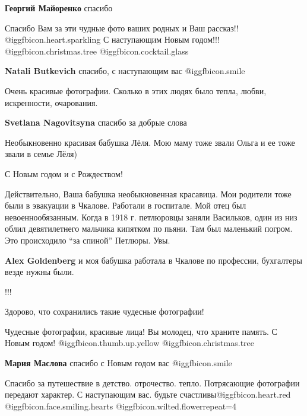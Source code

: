 \begin{itemize}
\textbf{Георгий Майоренко} спасибо

Спасибо Вам за эти чудные фото ваших родных и Ваш рассказ!! @igg{fbicon.heart.sparkling} 
С наступающим Новым годом!!! @igg{fbicon.christmas.tree}  @igg{fbicon.cocktail.glass} 

\textbf{Natali Butkevich} спасибо, с наступающим вас  @igg{fbicon.smile} 

Очень красивые фотографии. Сколько в этих людях было тепла, любви, искренности,
очарования.

\textbf{Svetlana Nagovitsyna} спасибо за добрые слова


Необыкновенно красивая бабушка Лёля. Мою маму тоже звали Ольга и ее тоже звали
в семье Лёля)

С Новым годом и с Рождеством!


Действительно, Ваша бабушка необыкновенная красавица. Мои родители тоже были в
эвакуации в Чкалове. Работали в госпитале. Мой отец был невоеннообязанным.
Когда в 1918 г. петлюровцы заняли Васильков, один из низ облил девятилетнего
мальчика кипятком по пьяни. Там был маленький погром. Это происходило \enquote{за
спиной} Петлюры. Увы.

\begin{itemize} %
\textbf{Alex Goldenberg} и моя бабушка работала в Чкалове по профессии, бухгалтеры везде нужны были.

!!!
\end{itemize} %

Здорово, что сохранились такие чудесные фотографии!


Чудесные фотографии, красивые лица! Вы молодец, что храните память. С Новым
годом!  @igg{fbicon.thumb.up.yellow}  @igg{fbicon.christmas.tree} 

\textbf{Мария Маслова} спасибо с Новым годом вас  @igg{fbicon.smile} 


Спасибо за путешествие в детство. отрочество. тепло. Потрясающие фотографии
передают характер. С наступающим вас. будьте счастливы@igg{fbicon.heart.red}
@igg{fbicon.face.smiling.hearts}  @igg{fbicon.wilted.flower}{repeat=4} 


\end{itemize}
